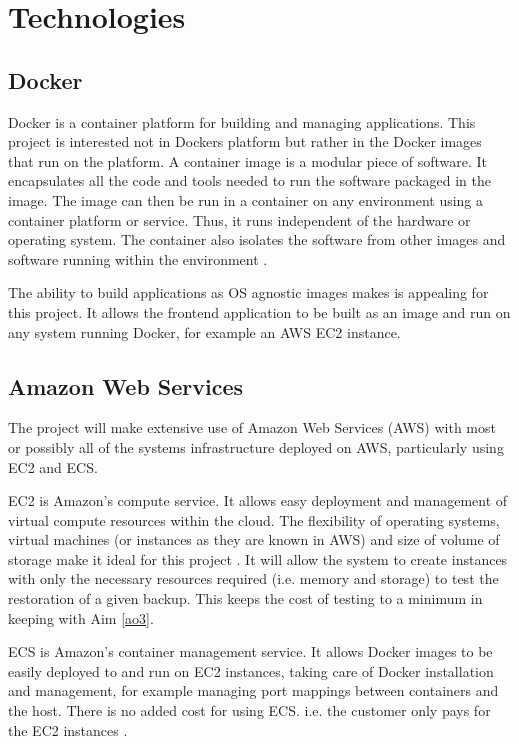 \section{Technologies}

\subsection{Docker}
Docker is a container platform for building and managing applications. This project is interested not in Dockers platform but rather in the Docker images that run on the platform. A container image is a modular piece of software. It encapsulates all the code and tools needed to run the software packaged in the image. The image can then be run in a container on any environment using a container platform or service. Thus, it runs independent of the hardware or operating system. The container also isolates the software from other images and software running within the environment \citep{docker}.

The ability to build applications as OS agnostic images makes is appealing for this project. It allows the frontend application to be built as an image and run on any system running Docker, for example an AWS EC2 instance. 


\subsection{Amazon Web Services}
The project will make extensive use of Amazon Web Services (AWS) with most or possibly all of the systems infrastructure deployed on AWS, particularly using EC2 and ECS.

EC2 is Amazon's compute service. It allows easy deployment and management of virtual compute resources within the cloud. The flexibility of operating systems, virtual machines (or instances as they are known in AWS) and size of volume of storage make it ideal for this project \citep{ec2}. It will allow the system to create instances with only the necessary resources required (i.e. memory and storage) to test the restoration of a given backup. This keeps the cost of testing to a minimum in keeping with Aim \ref{ao3}.

ECS is Amazon's container management service. It allows Docker images to be easily deployed to and run on  EC2 instances, taking care of Docker installation and management, for example managing port mappings between containers and the host. There is no added cost for using ECS. i.e. the customer only pays for the EC2 instances \citep{ecs}. 

